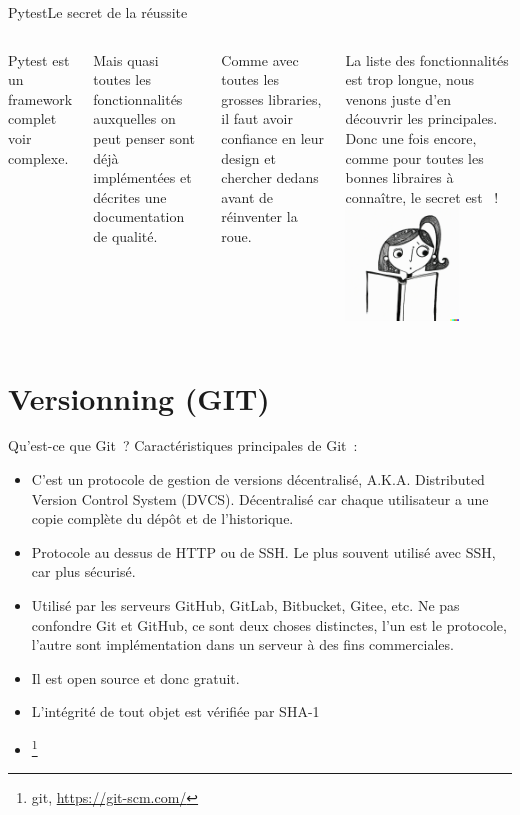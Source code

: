 \documentclass{beamer}
\begin{document}
    \begin{frame}{Pytest}{Le secret de la réussite}
        \transdissolve
        \begin{columns}
            Pytest est un framework complet voir complexe.

            Mais quasi toutes les fonctionnalités auxquelles on peut penser sont déjà implémentées et décrites une documentation de qualité.

            Comme avec toutes les grosses libraries, il faut avoir confiance en leur design et chercher dedans avant de réinventer la roue.

            La liste des fonctionnalités est trop longue, nous venons juste d'en découvrir les principales.
            \bigbreak
            Donc une fois encore, comme pour toutes les bonnes libraires à connaître, le secret est ~!
            \centering
            \includegraphics[width=3cm]{image/girl-rtfm}
        \end{columns}
    \end{frame}


    \section{Versionning (GIT)}\label{sec:versionning-(git)}

    \begin{frame}{Qu'est-ce que Git~?}
        \transdissolve
        Caractéristiques principales de Git~:
        \begin{itemize}
            \item C'est un protocole de gestion de versions décentralisé, A.K.A. Distributed Version Control System (DVCS).
            Décentralisé car chaque utilisateur a une copie complète du dépôt et de l'historique.
            \item Protocole au dessus de HTTP ou de SSH. Le plus souvent utilisé avec SSH, car plus sécurisé.
            \item Utilisé par les serveurs GitHub, GitLab, Bitbucket, Gitee, etc.
            Ne pas confondre Git et GitHub, ce sont deux choses distinctes, l'un est le protocole, l'autre sont implémentation dans un serveur à des fins commerciales.
            \item Il est open source et donc gratuit.
            \item L'intégrité de tout objet est vérifiée par SHA-1
            \item {}\footnote{git, \url{https://git-scm.com/}} 
        \end{itemize}
    \end{frame}
\end{document}
